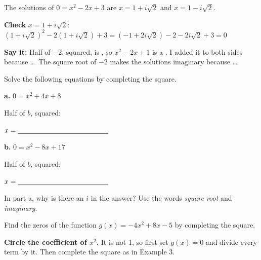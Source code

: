 The solutions of $0=x^2-2x+3$ are $x=1+i\sqrt{2}$ and $x=1-i\sqrt{2}$.

\textbf{Check} $x=1+i\sqrt2$: \ $(1+i\sqrt2)^2-2(1+i\sqrt2)+3=(-1+2i\sqrt2)-2-2i\sqrt2+3=0$ \checkmark

\textbf{Say it:} Half of $-2$, squared, is \blank[1.2cm], so $x^2-2x+1$ is a \blank[3.2cm]. I added it to both sides because \dots\ The square root of $-2$ makes the solutions imaginary because \dots
\lines[2]

\newpage

Solve the following equations by completing the square.

\begin{minipage}[t]{0.48\textwidth}
\textbf{a.} $0=x^2+4x+8$

\vspace{4pt}
Half of $b$, squared: \blank[2.4cm]
\lines[7]

\vspace{4pt}
$x=\blank[4.5cm]$
\end{minipage}\hfill
\begin{minipage}[t]{0.48\textwidth}
\textbf{b.} $0=x^2-8x+17$

\vspace{4pt}
Half of $b$, squared: \blank[2.4cm]
\lines[7]

\vspace{4pt}
$x=\blank[4.5cm]$
\end{minipage}

In part a, why is there an $i$ in the answer? Use the words \emph{square root} and \emph{imaginary}.\lines[2]

Find the zeros of the function $g(x)=-4x^2+8x-5$ by completing the square.

\textbf{Circle the coefficient of $x^2$.} It is not 1, so first set $g(x)=0$ and divide every term by it. Then complete the square as in Example 3.

